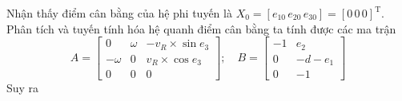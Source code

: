           \hspace{0.6cm}Nhận thấy điểm cân bằng của hệ phi tuyến là $X_0 = [e_{10} \, e_{20} \, e_{30}] = [0 \, 0 \, 0]^{\text{T}}$. Phân tích và tuyến tính hóa hệ quanh điểm cân bằng ta tính được các ma trận
          \begin{equation*}
               A = \begin{bmatrix}
               0 & \omega & -v_R \times \sin e_3 \\
               -\omega & 0 & v_R \times \cos e_3 \\
               0 & 0 & 0
               \end{bmatrix}; \quad B = \begin{bmatrix}
               -1 & e_2 \\
               0 & -d - e_1 \\
               0 & -1
               \end{bmatrix}
          \end{equation*}
          \hspace*{0.6cm}Suy ra 
